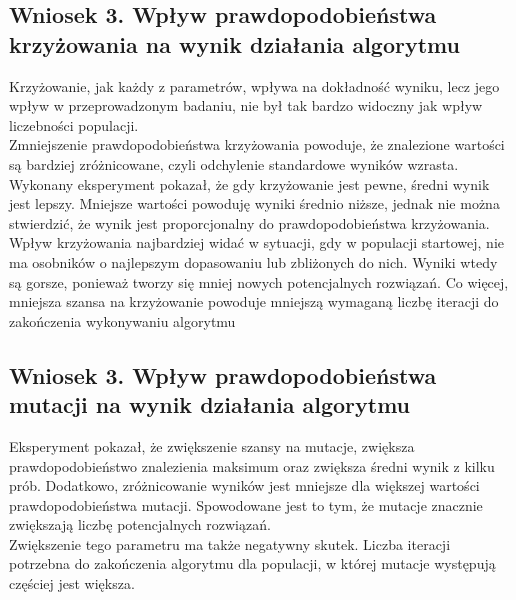 \documentclass[a4paper,11pt]{article}
\begin{document}
		\subsection{Wniosek 3. Wpływ prawdopodobieństwa krzyżowania na wynik działania algorytmu}
		Krzyżowanie, jak każdy z parametrów, wpływa na dokładność wyniku, lecz jego wpływ w przeprowadzonym badaniu, nie był tak bardzo widoczny jak wpływ liczebności populacji.\\
		Zmniejszenie prawdopodobieństwa krzyżowania powoduje, że znalezione wartości są bardziej zróżnicowane, czyli odchylenie standardowe wyników wzrasta. \\
		Wykonany eksperyment pokazał, że gdy krzyżowanie jest pewne, średni wynik jest lepszy. Mniejsze wartości powoduję wyniki średnio niższe, jednak nie można stwierdzić, że wynik jest proporcjonalny do prawdopodobieństwa krzyżowania. \\
		Wpływ krzyżowania najbardziej widać w sytuacji, gdy w populacji startowej, nie ma osobników o najlepszym dopasowaniu lub zbliżonych do nich. Wyniki wtedy są gorsze, ponieważ tworzy się mniej nowych potencjalnych rozwiązań. 
		Co więcej, mniejsza szansa na krzyżowanie powoduje mniejszą wymaganą liczbę iteracji do zakończenia wykonywaniu algorytmu
		\subsection{Wniosek 3. Wpływ prawdopodobieństwa mutacji na wynik działania algorytmu}
		Eksperyment pokazał, że zwiększenie szansy na mutacje, zwiększa prawdopodobieństwo znalezienia maksimum oraz zwiększa średni wynik z kilku prób. Dodatkowo, zróżnicowanie wyników jest mniejsze dla większej wartości prawdopodobieństwa mutacji. Spowodowane jest to tym, że mutacje znacznie zwiększają liczbę potencjalnych rozwiązań.\\
		Zwiększenie tego parametru ma także negatywny skutek. Liczba iteracji potrzebna do zakończenia algorytmu dla populacji, w której mutacje występują częściej jest większa.
		
	
\end{document}
